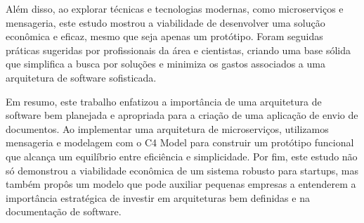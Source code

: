 Além disso, ao explorar técnicas e tecnologias modernas, como microserviços e mensageria, este estudo mostrou a viabilidade de desenvolver uma solução econômica e eficaz, mesmo que seja apenas um protótipo. Foram seguidas práticas sugeridas por profissionais da área e cientistas, criando uma base sólida que simplifica a busca por soluções e minimiza os gastos associados a uma arquitetura de software sofisticada.

Em resumo, este trabalho enfatizou a importância de uma arquitetura de software bem planejada e apropriada para a criação de uma aplicação de envio de documentos. Ao implementar uma arquitetura de microserviços, utilizamos mensageria e modelagem com o C4 Model para construir um protótipo funcional que alcança um equilíbrio entre eficiência e simplicidade. Por fim, este estudo não só demonstrou a viabilidade econômica de um sistema robusto para startups, mas também propôs um modelo que pode auxiliar pequenas empresas a entenderem a importância estratégica de investir em arquiteturas bem definidas e na documentação de software.
